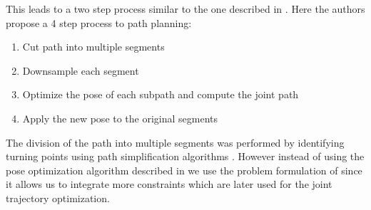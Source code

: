 \documentclass[5p,times,procedia]{elsarticle}
\begin{document}
This leads to a two step process similar to the one described in \cite{stroke_division}.
Here the authors propose a 4 step process to path planning:
\begin{enumerate}
  \item Cut path into multiple segments
  \item Downsample each segment
  \item Optimize the pose of each subpath and compute the joint path
  \item Apply the new pose to the original segments
\end{enumerate}
The division of the path into multiple segments was performed by identifying turning points using path simplification algorithms \cite{stroke_division}.
However instead of using the pose optimization algorithm described in \cite{stroke_division} we use the problem formulation of \cite{previous_work} since it allows us to integrate more constraints which are later used for the joint trajectory optimization.


\end{document}

